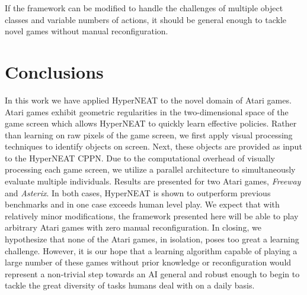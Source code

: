 \documentclass{acm_proc_article-sp}
\begin{document}
If the framework can be modified to handle the challenges of multiple object classes and variable numbers of actions, it should be general enough to tackle novel games without manual reconfiguration.

\section{Conclusions}
\label{sec:conclusion}
In this work we have applied HyperNEAT to the novel domain of Atari games. Atari games exhibit geometric regularities in the two-dimensional space of the game screen which allows HyperNEAT to quickly learn effective policies. Rather than learning on raw pixels of the game screen, we first apply visual processing techniques to identify objects on screen. Next, these objects are provided as input to the HyperNEAT CPPN. Due to the computational overhead of visually processing each game screen, we utilize a parallel architecture to simultaneously evaluate multiple individuals. Results are presented for two Atari games, \textit{Freeway} and \textit{Asterix}. In both cases, HyperNEAT is shown to outperform previous benchmarks\cite{naddaf10} and in one case exceeds human level play. We expect that with relatively minor modifications, the framework presented here will be able to play arbitrary Atari games with zero manual reconfiguration. In closing, we hypothesize that none of the Atari games, in isolation, poses too great a learning challenge. However, it is our hope that a learning algorithm capable of playing a large number of these games without prior knowledge or reconfiguration would represent a non-trivial step towards an AI general and robust enough to begin to tackle the great diversity of tasks humans deal with on a daily basis.



%

\end{document}

